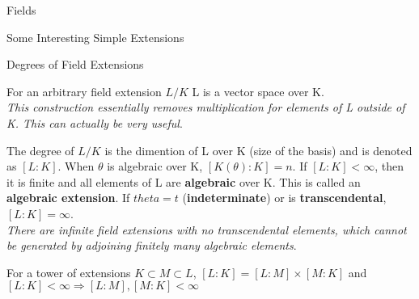 \documentclass[12pt, letterpaper]{article}
\begin{document}
\begin{section}{Fields}
\begin{subsection}{Some Interesting Simple Extensions}
  \end{subsection}

  \begin{subsection}{Degrees of Field Extensions}

    For an arbitrary field extension \(L / K\) L is a vector space over K. \\
    \textit{This construction essentially removes multiplication for elements
      of L outside of K. This can actually be very useful}.

    The degree of \(L / K\) is the dimention of L over K (size of the basis)
    and is denoted as \([L : K]\). When \(\theta\) is algebraic over K,
    \([K(\theta) : K] = n\). If \([L : K] < \infty\), then it is finite and
    all elements of L are \textbf{algebraic} over K. This is called an
    \textbf{algebraic extension}. If \(theta = t\) (\textbf{indeterminate}) or
    is \textbf{transcendental}, \([L : K] = \infty\). \\
    \textit{There are infinite field extensions with no transcendental
      elements, which cannot be generated by adjoining finitely many algebraic
      elements}.

    For a tower of extensions \(K \subset M \subset L\), \([L : K] =
    [L : M] \times [M : K]\) and \([L : K] < \infty \Rightarrow [L : M], [M : K]
    < \infty\)

  \end{subsection}

\end{section}
\end{document}
